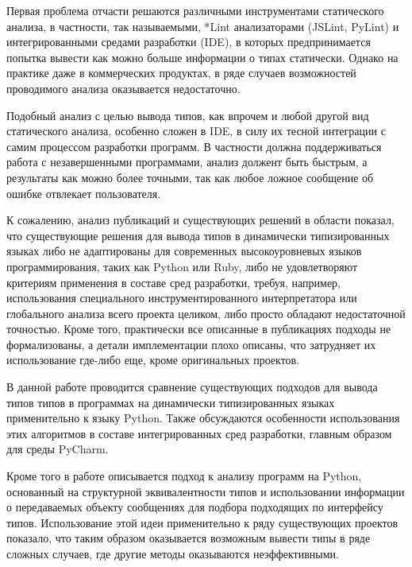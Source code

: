 Первая проблема отчасти решаются различными инструментами статического
анализа, в частности, так называемыми, *Lint анализаторами (JSLint, PyLint) и
интегрированными средами разработки (IDE), в которых предпринимается попытка
вывести как можно больше информации о типах статически.  Однако на практике даже
в коммерческих продуктах, в ряде случаев возможностей проводимого анализа
оказывается недостаточно.

Подобный анализ с целью вывода типов, как впрочем и любой другой вид
статического анализа, особенно сложен в IDE, в силу их тесной
интеграции с самим процессом разработки программ. В частности должна
поддерживаться работа с незавершенными программами, анализ должент быть быстрым,
а результаты как можно более точными, так как любое ложное сообщение об ошибке
отвлекает пользователя.

К сожалению, анализ публикаций и существующих решений в области показал, что
существующие решения для вывода типов в динамически типизированных языках либо
не адаптированы для современных высокоуровневых языков программирования, таких
как Python или Ruby, либо не удовлетворяют критериям применения в составе сред
разработки, требуя, например, использования специального инструментированного
интерпретатора или глобального анализа всего проекта целиком, либо просто
обладают недостаточной точностью. Кроме того, практически все описанные в публикациях
подходы не формализованы, а детали имплементации плохо описаны, что
затрудняет их использование где-либо еще, кроме оригинальных проектов.

В данной работе проводится сравнение существующих подходов для
вывода типов типов в программах на динамически типизированных языках
применительно к языку Python. Также обсуждаются особенности использования этих
алгоритмов в составе интегрированных сред разработки, главным образом для среды
PyCharm.

Кроме того в работе описывается подход к анализу программ на Python, основанный
на структурной эквивалентности типов и использовании информации о передаваемых
объекту сообщениях для подбора подходящих по интерфейсу типов. Использование
этой идеи применительно к ряду существующих проектов показало, что таким
образом оказывается возможным вывести типы в ряде сложных случаев, где другие
методы оказываются неэффективными.


